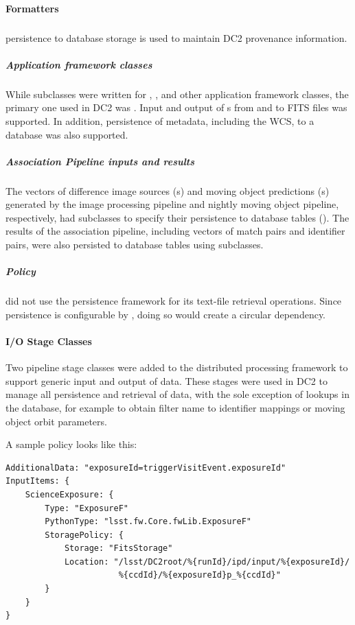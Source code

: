 \paragraph{Formatters}

\subparagraph{}
 persistence to database storage is used to maintain DC2
provenance information.

\subparagraph{Application framework classes}

While  subclasses were written for ,
, and other application framework classes, the primary one
used in DC2 was .  Input and output of s
from and to FITS files was supported.  In addition, persistence of
 metadata, including the WCS, to a database was also
supported.

\subparagraph{Association Pipeline inputs and results}
The vectors of difference image sources (s) and moving object
predictions (s) generated by the image processing pipeline and
nightly moving object pipeline, respectively, had  subclasses
to specify their persistence to database tables ().  The
results of the association pipeline, including vectors of match pairs and
identifier pairs, were also persisted to database tables using 
subclasses.

\subparagraph{Policy}
 did not use the persistence framework for its text-file retrieval
operations.  Since persistence is configurable by , doing so would
create a circular dependency.

\paragraph{I/O Stage Classes}

Two pipeline stage classes were added to the distributed processing framework
to support generic input and output of data.  These stages were used in
DC2 to manage all persistence and retrieval of data, with the sole
exception of lookups in the database, for example to obtain filter name
to identifier mappings or moving object orbit parameters.

A sample  policy looks like this:
\begin{verbatim}
AdditionalData: "exposureId=triggerVisitEvent.exposureId"
InputItems: {
    ScienceExposure: {
        Type: "ExposureF"
        PythonType: "lsst.fw.Core.fwLib.ExposureF"
        StoragePolicy: {
            Storage: "FitsStorage"
            Location: "/lsst/DC2root/%{runId}/ipd/input/%{exposureId}/
                       %{ccdId}/%{exposureId}p_%{ccdId}"
        }
    }
}
\end{verbatim}

